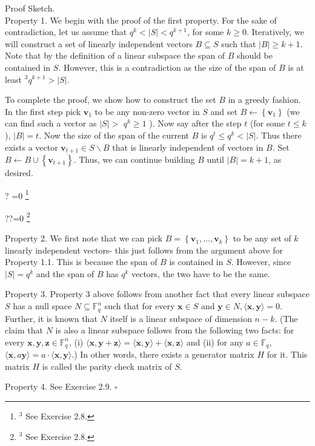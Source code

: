 \documentclass[10pt]{article}
\let\svthefootnote\thefootnote
\newcommand\blfootnotetext[1]{%
  \let\thefootnote\relax\footnote{#1}%
  \addtocounter{footnote}{-1}%
  \let\thefootnote\svthefootnote%
}
\let\svfootnotetext\footnotetext
\renewcommand\footnotetext[2][?]{%
  \if\relax#1\relax%
    \ifnum\value{footnote}=0\blfootnotetext{#2}\else\svfootnotetext{#2}\fi%
  \else%
    \if?#1\ifnum\value{footnote}=0\blfootnotetext{#2}\else\svfootnotetext{#2}\fi%
    \else\svfootnotetext[#1]{#2}\fi%
  \fi
}
\begin{document}
Proof Sketch.\\
Property 1. We begin with the proof of the first property. For the sake of contradiction, let us assume that $q^{k}<|S|<q^{k+1}$, for some $k \geq 0$. Iteratively, we will construct a set of linearly independent vectors $B \subseteq S$ such that $|B| \geq k+1$. Note that by the definition of a linear subspace the span of $B$ should be contained in $S$. However, this is a contradiction as the size of the span of $B$ is at least ${ }^{3} q^{k+1}>|S|$.

To complete the proof, we show how to construct the set $B$ in a greedy fashion. In the first step pick $\mathbf{v}_{1}$ to be any non-zero vector in $S$ and set $B \leftarrow\left\{\mathbf{v}_{1}\right\}$ (we can find such a vector as $|S|>$ $q^{k} \geq 1$ ). Now say after the step $t$ (for some $t \leq k$ ), $|B|=t$. Now the size of the span of the current $B$ is $q^{t} \leq q^{k}<|S|$. Thus there exists a vector $\mathbf{v}_{t+1} \in S \backslash B$ that is linearly independent of vectors in $B$. Set $B \leftarrow B \cup\left\{\mathbf{v}_{t+1}\right\}$. Thus, we can continue building $B$ until $|B|=k+1$, as desired.

Property 2. We first note that we can pick $B=\left\{\mathbf{v}_{1}, \ldots, \mathbf{v}_{k}\right\}$ to be any set of $k$ linearly independent vectors- this just follows from the argument above for Property 1.1. This is because the span of $B$ is contained in $S$. However, since $|S|=q^{k}$ and the span of $B$ has $q^{k}$ vectors, the two have to be the same.

Property 3. Property 3 above follows from another fact that every linear subspace $S$ has a null space $N \subseteq \mathbb{F}_{q}^{n}$ such that for every $\mathbf{x} \in S$ and $\mathbf{y} \in N,\langle\mathbf{x}, \mathbf{y}\rangle=0$. Further, it is known that $N$ itself is a linear subspace of dimension $n-k$. (The claim that $N$ is also a linear subspace follows from the following two facts: for every $\mathbf{x}, \mathbf{y}, \mathbf{z} \in \mathbb{F}_{q}^{n}$, (i) $\langle\mathbf{x}, \mathbf{y}+\mathbf{z}\rangle=\langle\mathbf{x}, \mathbf{y}\rangle+\langle\mathbf{x}, \mathbf{z}\rangle$ and (ii) for any $a \in \mathbb{F}_{q}$, $\langle\mathbf{x}, a \mathbf{y}\rangle=a \cdot\langle\mathbf{x}, \mathbf{y}\rangle$.) In other words, there exists a generator matrix $H$ for it. This matrix $H$ is called the parity check matrix of $S$.

Property 4. See Exercise 2.9. \(\square\)
\end{document}
